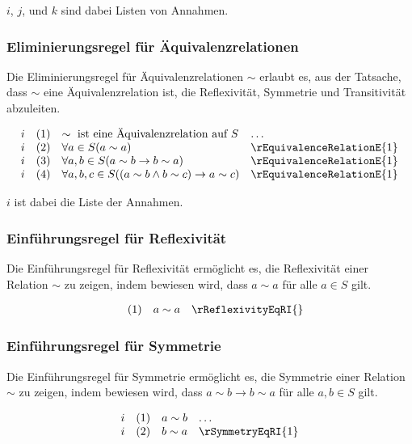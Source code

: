 \documentclass[main.tex]{subfiles}
\begin{document}
\(i\), \(j\), und \(k\) sind dabei Listen von Annahmen.

\subsubsection*{Eliminierungsregel für Äquivalenzrelationen}
\label{rule:rEquivalenceRelationE}
Die Eliminierungsregel für Äquivalenzrelationen \(\sim\) erlaubt es, aus der Tatsache, dass \(\sim\) eine Äquivalenzrelation ist, die Reflexivität, Symmetrie und Transitivität abzuleiten.

\[
\begin{array}{llll}
    i       & (1) & \sim \text{ ist eine Äquivalenzrelation auf } S & \dots \\
    i       & (2) & \forall a \in S (a \sim a) & \rEquivalenceRelationE{1} \\
    i       & (3) & \forall a, b \in S (a \sim b \rightarrow b \sim a) & \rEquivalenceRelationE{1} \\
    i       & (4) & \forall a, b, c \in S ((a \sim b \land b \sim c) \rightarrow a \sim c) & \rEquivalenceRelationE{1}
\end{array}
\]

\(i\) ist dabei die Liste der Annahmen.

\subsubsection*{Einführungsregel für Reflexivität}
\label{rule:rReflexivityEqRI}
Die Einführungsregel für Reflexivität ermöglicht es, die Reflexivität einer Relation \(\sim\) zu zeigen, indem bewiesen wird, dass \(a \sim a\) für alle \(a \in S\) gilt.

\[
\begin{array}{llll}
      & (1) & a \sim a & \rReflexivityEqRI{}
\end{array}
\]

\subsubsection*{Einführungsregel für Symmetrie}
\label{rule:rSymmetryEqRI}
Die Einführungsregel für Symmetrie ermöglicht es, die Symmetrie einer Relation \(\sim\) zu zeigen, indem bewiesen wird, dass \(a \sim b \rightarrow b \sim a\) für alle \(a, b \in S\) gilt.

\[
\begin{array}{llll}
    i       & (1) & a \sim b & \dots \\
    i       & (2) & b \sim a & \rSymmetryEqRI{1}
\end{array}
\]
\end{document}
